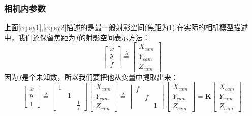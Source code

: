 \documentclass[12pt]{article}
\begin{document}
\subsubsection{相机内参数}
上面\ref{eq:sy1},\ref{eq:sy2}描述的是最一般射影空间(焦距为1),在实际的相机模型描述中，我们还保留焦距为$f$的射影空间表示方法：
\begin{equation}
    \left[\begin{array}{l}
        x \\
        y \\
        f
        \end{array}\right]\overset{\lambda}{=}\left[\begin{array}{l}
        X_{cam} \\
        Y_{cam} \\
        Z_{cam}
        \end{array}\right]
\end{equation}
因为$f$是个未知数，所以我们要把他从变量中提取出来：
\begin{equation}
    \left[\begin{array}{l}
        x \\
        y \\
        1
        \end{array}\right]\overset{\lambda}{=}
        \left[\begin{array}{lll}
            1 &  & \\
              & 1 &\\
              &   & \frac{1}{f}
        \end{array}\right]
        \left[\begin{array}{l}
        X_{cam} \\
        Y_{cam} \\
        Z_{cam}
        \end{array}\right]\overset{\lambda}{=}
    \left[\begin{array}{lll}
        f &  & \\
          & f &\\
          &   & 1
    \end{array}\right]
    \left[\begin{array}{l}
    X_{cam} \\
    Y_{cam} \\
    Z_{cam}
    \end{array}\right]=\mathbf{K}\left[\begin{array}{l}
        X_{cam} \\
        Y_{cam} \\
        Z_{cam}
        \end{array}\right]
    \label{eq:nc}
\end{equation}
\end{document}
